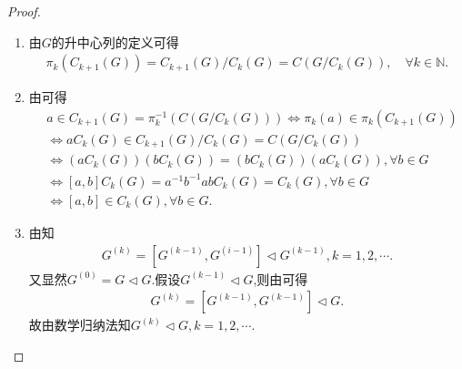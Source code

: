 \documentclass[../../main.tex]{subfiles}%
\begin{document}
\begin{proof}
\begin{enumerate}[(1)]
\begin{align*}
&=\left[ \left( a_1,b_1 \right) ,\left( a_2,b_2 \right) \right] \in \left[ A\times B,\Gamma _{k-1}\left( A \right) \times \Gamma _{k-1}\left( B \right) \right].
\end{align*}
因此$\Gamma _k\left( A \right) \times \Gamma _k\left( B \right) \subseteq \left[ A\times B,\Gamma _{k-1}\left( A \right) \times \Gamma _{k-1}\left( B \right) \right]$。故$\left[ A\times B,\Gamma _{k-1}\left( A \right) \times \Gamma _{k-1}\left( B \right) \right] =\Gamma _k\left( A \right) \times \Gamma _k\left( B \right)$。再由\eqref{eq:::--q89h2dfwfzznmnghmghkhlyujf21.1}式可得
\begin{align*}
\Gamma _k\left( A\times B \right) =\Gamma _k\left( A \right) \times \Gamma _k\left( B \right).
\end{align*}
故由数学归纳法可知
\begin{align*}
\Gamma _k\left( A\times B \right) =\Gamma _k\left( A \right) \times \Gamma _k\left( B \right),\quad \forall k\in \mathbb{N}.
\end{align*}

\item 由$G$的升中心列的定义可得
\begin{align*}
\pi_k\left(C_{k+1}(G)\right) = C_{k+1}(G)/C_k(G) = C\left(G/C_k(G)\right),\quad \forall k\in \mathbb{N}.
\end{align*}

\item 由可得
\begin{align*}
&a\in C_{k+1}(G) = \pi_k^{-1}\left(C\left(G/C_k(G)\right)\right)\Longleftrightarrow \pi_k(a) \in \pi_k\left(C_{k+1}(G)\right) \\
&\Longleftrightarrow aC_k(G) \in C_{k+1}(G)/C_k(G) = C\left(G/C_k(G)\right) \\
&\Longleftrightarrow \left(aC_k(G)\right)\left(bC_k(G)\right) = \left(bC_k(G)\right)\left(aC_k(G)\right),\forall b\in G \\
&\Longleftrightarrow [a,b]C_k(G) = a^{-1}b^{-1}abC_k(G) = C_k(G),\forall b\in G \\
&\Longleftrightarrow [a,b] \in C_k(G),\forall b\in G.
\end{align*}

\item 由知
\begin{align*}
G^{(k)}=[G^{(k-1)},G^{(i-1)}]\lhd G^{(k-1)},k=1,2,\cdots.
\end{align*}
又显然$G^{\left( 0 \right)}=G\lhd G$.假设$G^{(k-1)}\lhd G$,则由可得
\begin{align*}
G^{\left( k \right)}=\left[ G^{\left( k-1 \right)},G^{\left( k-1 \right)} \right] \lhd G.
\end{align*}
故由数学归纳法知$G^{\left( k \right)}\lhd G,k=1,2,\cdots.$


\end{enumerate}
\end{proof}
\end{document}
